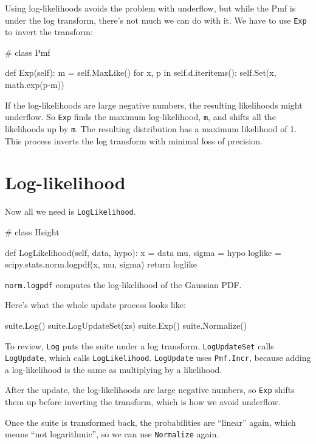 \documentclass[12pt]{book}
\theoremstyle{exercise}
\begin{document}
Using log-likelihoods avoids the problem with underflow, but while
the Pmf is under the log transform, there's not much we can do with
it.  We have to use {\tt Exp} to invert the transform:

\begin{code}
# class Pmf

    def Exp(self):
        m = self.MaxLike()
        for x, p in self.d.iteritems():
            self.Set(x, math.exp(p-m))
\end{code}

If the log-likelihoods are large negative numbers, the resulting
likelihoods might underflow.  So {\tt Exp} finds the maximum
log-likelihood, {\tt m}, and shifts all the likelihoods up by {\tt m}.
The resulting distribution has a maximum likelihood of 1.  This
process inverts the log transform with minimal loss of precision.


\section{Log-likelihood}

Now all we need is {\tt LogLikelihood}.

\begin{code}
# class Height

    def LogLikelihood(self, data, hypo):
        x = data
        mu, sigma = hypo
        loglike = scipy.stats.norm.logpdf(x, mu, sigma)
        return loglike
\end{code}

{\tt norm.logpdf} computes the log-likelihood of the
Gaussian PDF.


Here's what the whole update process looks like:

\begin{code}
    suite.Log()
    suite.LogUpdateSet(xs)
    suite.Exp()
    suite.Normalize()
\end{code}

To review, {\tt Log} puts the suite under a log transform.
{\tt LogUpdateSet} calls {\tt LogUpdate}, which calls
{\tt LogLikelihood}.  {\tt LogUpdate} uses {\tt Pmf.Incr},
because adding a log-likelihood is the same as multiplying
by a likelihood.

After the update, the log-likelihoods are large negative
numbers, so {\tt Exp} shifts them up before inverting the
transform, which is how we avoid underflow.

Once the suite is transformed back, the probabilities
are ``linear'' again, which means ``not logarithmic'',
so we can use {\tt Normalize} again.
\end{document}
